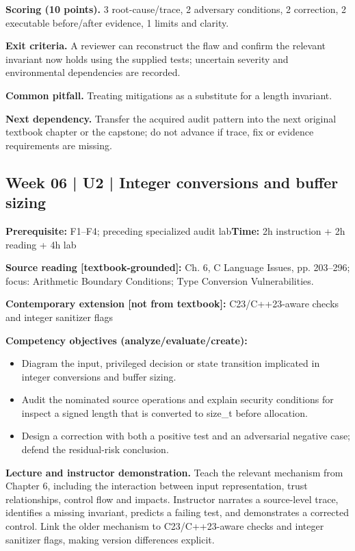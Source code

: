 \documentclass[10pt,letterpaper]{article}
\begin{document}
\textbf{Scoring (10 points).} 3 root-cause/trace, 2 adversary conditions, 2 correction, 2 executable before/after evidence, 1 limits and clarity.

\textbf{Exit criteria.} A reviewer can reconstruct the flaw and confirm the relevant invariant now holds using the supplied tests; uncertain severity and environmental dependencies are recorded.

\textbf{Common pitfall.} Treating mitigations as a substitute for a length invariant.

\textbf{Next dependency.} Transfer the acquired audit pattern into the next original textbook chapter or the capstone; do not advance if trace, fix or evidence requirements are missing.

\subsection{Week 06 | U2 | Integer conversions and buffer sizing}
\textbf{Prerequisite:} F1--F4; preceding specialized audit lab\hfill\textbf{Time:} 2h instruction + 2h reading + 4h lab

\textbf{Source reading [textbook-grounded]:} Ch. 6, C Language Issues, pp. 203--296; focus: Arithmetic Boundary Conditions; Type Conversion Vulnerabilities.

\textbf{Contemporary extension [not from textbook]:} C23/C++23-aware checks and integer sanitizer flags

\textbf{Competency objectives (analyze/evaluate/create):}
\begin{itemize}[leftmargin=*,itemsep=2pt]
\item Diagram the input, privileged decision or state transition implicated in integer conversions and buffer sizing.
\item Audit the nominated source operations and explain security conditions for inspect a signed length that is converted to size\_t before allocation.
\item Design a correction with both a positive test and an adversarial negative case; defend the residual-risk conclusion.
\end{itemize}
\textbf{Lecture and instructor demonstration.} Teach the relevant mechanism from Chapter 6, including the interaction between input representation, trust relationships, control flow and impacts. Instructor narrates a source-level trace, identifies a missing invariant, predicts a failing test, and demonstrates a corrected control. Link the older mechanism to C23/C++23-aware checks and integer sanitizer flags, making version differences explicit.
\end{document}
